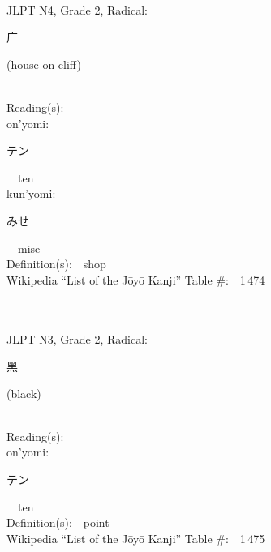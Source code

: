 \begin{multicols}{2}
{\fontsize{34pt}{40pt}  }\ \ \\  %
{JLPT N4, Grade 2, Radical:\ \ {\begin{CJK}{UTF8}{min} 广 \end{CJK}} (house on cliff) } \\
Reading(s):\ \ \\
{\hspace*{1em}}on'yomi:\ \ \\
{\hspace*{2em}}{\begin{CJK}{UTF8}{min} テン \end{CJK}}\ \ ten\ \ \\
{\hspace*{1em}}kun'yomi:\ \ \\
{\hspace*{2em}}{\begin{CJK}{UTF8}{min} みせ \end{CJK}}\ \ mise\ \ \\
Definition(s):\ \ shop \\
Wikipedia ``List of the J\=oy\=o Kanji'' Table \#:\ \ 1\,474 \\
\ \ \\
{\fontsize{34pt}{40pt}  }\ \ \\  %
{JLPT N3, Grade 2, Radical:\ \ {\begin{CJK}{UTF8}{min} 黑 \end{CJK}} (black) } \\
Reading(s):\ \ \\
{\hspace*{1em}}on'yomi:\ \ \\
{\hspace*{2em}}{\begin{CJK}{UTF8}{min} テン \end{CJK}}\ \ ten\ \ \\
Definition(s):\ \ point \\
Wikipedia ``List of the J\=oy\=o Kanji'' Table \#:\ \ 1\,475 \\
\ \ \\
{\fontsize{34pt}{40pt}  }\ \ \\  %

\end{multicols}
